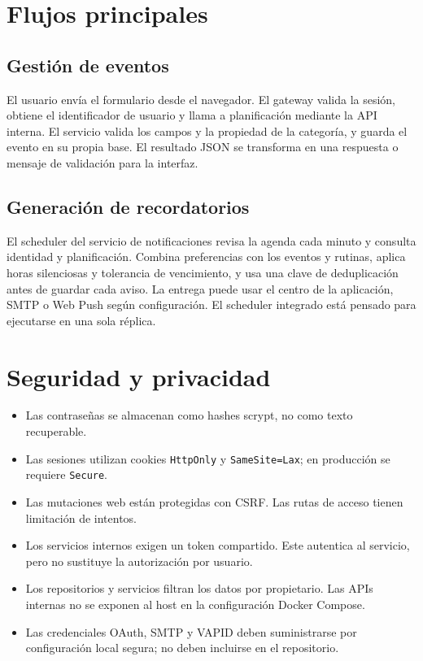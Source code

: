 \documentclass[12pt,a4paper]{article}
\begin{document}
\section{Flujos principales}
\subsection{Gestión de eventos}
El usuario envía el formulario desde el navegador. El gateway valida la sesión, obtiene el identificador de usuario y llama a planificación mediante la API interna. El servicio valida los campos y la propiedad de la categoría, y guarda el evento en su propia base. El resultado JSON se transforma en una respuesta o mensaje de validación para la interfaz.

\subsection{Generación de recordatorios}
El scheduler del servicio de notificaciones revisa la agenda cada minuto y consulta identidad y planificación. Combina preferencias con los eventos y rutinas, aplica horas silenciosas y tolerancia de vencimiento, y usa una clave de deduplicación antes de guardar cada aviso. La entrega puede usar el centro de la aplicación, SMTP o Web Push según configuración. El scheduler integrado está pensado para ejecutarse en una sola réplica.

\section{Seguridad y privacidad}
\begin{itemize}
  \item Las contraseñas se almacenan como hashes scrypt, no como texto recuperable.
  \item Las sesiones utilizan cookies \texttt{HttpOnly} y \texttt{SameSite=Lax}; en producción se requiere \texttt{Secure}.
  \item Las mutaciones web están protegidas con CSRF. Las rutas de acceso tienen limitación de intentos.
  \item Los servicios internos exigen un token compartido. Este autentica al servicio, pero no sustituye la autorización por usuario.
  \item Los repositorios y servicios filtran los datos por propietario. Las APIs internas no se exponen al host en la configuración Docker Compose.
  \item Las credenciales OAuth, SMTP y VAPID deben suministrarse por configuración local segura; no deben incluirse en el repositorio.
\end{itemize}
\end{document}
